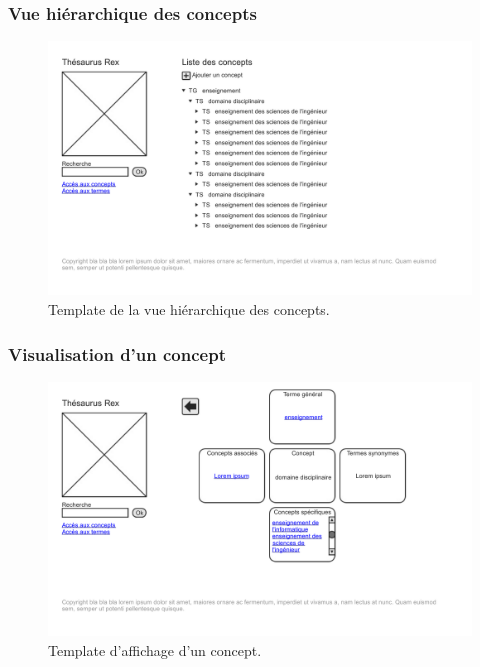 \subsubsection{Vue hiérarchique des concepts}
\begin{figure}[H]
\begin{center}
\includegraphics[width=\textwidth]{files/template_concepts}
\end{center}
\caption{Template de la vue hiérarchique des concepts.}
\end{figure}

\subsubsection{Visualisation d'un concept}
\begin{figure}[H]
\begin{center}
\includegraphics[width=\textwidth]{files/template_concept}
\end{center}
\caption{Template d'affichage d'un concept.}
\end{figure}

